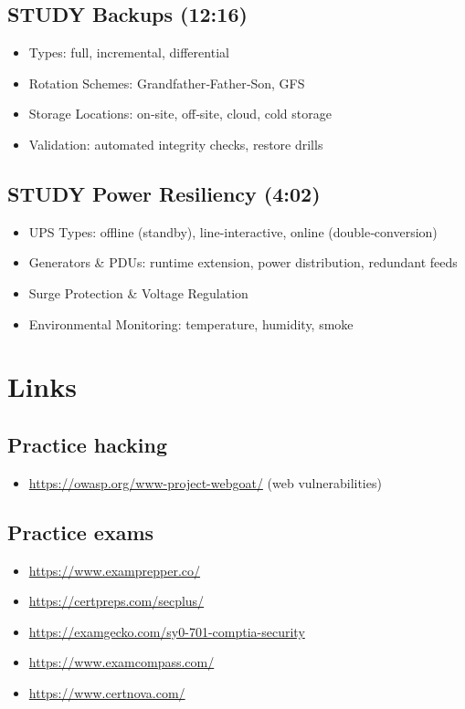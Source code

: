 \documentclass[11pt]{article}
\begin{document}
\subsection{{\bfseries\sffamily STUDY} Backups (12:16)}
\label{sec:orga4134b4}
\begin{itemize}
\item Types: full, incremental, differential
\item Rotation Schemes: Grandfather‑Father‑Son, GFS
\item Storage Locations: on‑site, off‑site, cloud, cold storage
\item Validation: automated integrity checks, restore drills
\end{itemize}
\subsection{{\bfseries\sffamily STUDY} Power Resiliency (4:02)}
\label{sec:org7fc4621}
\begin{itemize}
\item UPS Types: offline (standby), line‑interactive, online (double‑conversion)
\item Generators \& PDUs: runtime extension, power distribution, redundant feeds
\item Surge Protection \& Voltage Regulation
\item Environmental Monitoring: temperature, humidity, smoke
\end{itemize}
\section{Links}
\label{sec:org096fdb9}
\subsection{Practice hacking}
\label{sec:org14d53f5}
\begin{itemize}
\item \url{https://owasp.org/www-project-webgoat/} (web vulnerabilities)
\end{itemize}
\subsection{Practice exams}
\label{sec:orgc4f0f27}
\begin{itemize}
\item \url{https://www.examprepper.co/}
\item \url{https://certpreps.com/secplus/}
\item \url{https://examgecko.com/sy0-701-comptia-security}
\item \url{https://www.examcompass.com/}
\item \url{https://www.certnova.com/}
\end{itemize}
\end{document}
